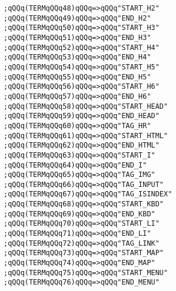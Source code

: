 \verb|;qQQq(TERMqQQq48)qQQq=>qQQq"START_H2"|\newline
\verb|;qQQq(TERMqQQq49)qQQq=>qQQq"END_H2"|\newline
\verb|;qQQq(TERMqQQq50)qQQq=>qQQq"START_H3"|\newline
\verb|;qQQq(TERMqQQq51)qQQq=>qQQq"END_H3"|\newline
\verb|;qQQq(TERMqQQq52)qQQq=>qQQq"START_H4"|\newline
\verb|;qQQq(TERMqQQq53)qQQq=>qQQq"END_H4"|\newline
\verb|;qQQq(TERMqQQq54)qQQq=>qQQq"START_H5"|\newline
\verb|;qQQq(TERMqQQq55)qQQq=>qQQq"END_H5"|\newline
\verb|;qQQq(TERMqQQq56)qQQq=>qQQq"START_H6"|\newline
\verb|;qQQq(TERMqQQq57)qQQq=>qQQq"END_H6"|\newline
\verb|;qQQq(TERMqQQq58)qQQq=>qQQq"START_HEAD"|\newline
\verb|;qQQq(TERMqQQq59)qQQq=>qQQq"END_HEAD"|\newline
\verb|;qQQq(TERMqQQq60)qQQq=>qQQq"TAG_HR"|\newline
\verb|;qQQq(TERMqQQq61)qQQq=>qQQq"START_HTML"|\newline
\verb|;qQQq(TERMqQQq62)qQQq=>qQQq"END_HTML"|\newline
\verb|;qQQq(TERMqQQq63)qQQq=>qQQq"START_I"|\newline
\verb|;qQQq(TERMqQQq64)qQQq=>qQQq"END_I"|\newline
\verb|;qQQq(TERMqQQq65)qQQq=>qQQq"TAG_IMG"|\newline
\verb|;qQQq(TERMqQQq66)qQQq=>qQQq"TAG_INPUT"|\newline
\verb|;qQQq(TERMqQQq67)qQQq=>qQQq"TAG_ISINDEX"|\newline
\verb|;qQQq(TERMqQQq68)qQQq=>qQQq"START_KBD"|\newline
\verb|;qQQq(TERMqQQq69)qQQq=>qQQq"END_KBD"|\newline
\verb|;qQQq(TERMqQQq70)qQQq=>qQQq"START_LI"|\newline
\verb|;qQQq(TERMqQQq71)qQQq=>qQQq"END_LI"|\newline
\verb|;qQQq(TERMqQQq72)qQQq=>qQQq"TAG_LINK"|\newline
\verb|;qQQq(TERMqQQq73)qQQq=>qQQq"START_MAP"|\newline
\verb|;qQQq(TERMqQQq74)qQQq=>qQQq"END_MAP"|\newline
\verb|;qQQq(TERMqQQq75)qQQq=>qQQq"START_MENU"|\newline
\verb|;qQQq(TERMqQQq76)qQQq=>qQQq"END_MENU"|\newline
